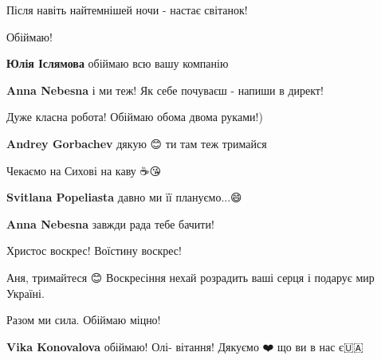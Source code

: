  
 
 
 
 

\qqSecCmt


Після навіть найтемнішей ночи - настає світанок!

Обіймаю!

\begin{itemize} %
\textbf{Юлія Іслямова} обіймаю всю вашу компанію🤗🤗🤗

\textbf{Anna Nebesna} і ми теж! Як себе почуваєш - напиши в директ!
\end{itemize} %


Дуже класна робота! Обіймаю обома двома руками!)

\begin{itemize} %
\textbf{Andrey Gorbachev} дякую 😊
ти там теж тримайся🤗🤗🤗

\end{itemize} %


Чекаємо на Сихові на каву ☕😘💙💛

\begin{itemize} %
\textbf{Svitlana Popeliasta} давно ми її плануємо...😄

\textbf{Anna Nebesna} завжди рада тебе бачити!

\end{itemize} %


Христос воскрес! Воїстину воскрес!

Аня, тримайтеся 😊 Воскресіння нехай розрадить ваші серця і подарує мир Україні.

Разом ми сила. Обіймаю міцно!

\begin{itemize} %
\textbf{Vika Konovalova} обіймаю! Олі- вітання! Дякуємо ❤️ що ви в нас є🇺🇦
\end{itemize} %
